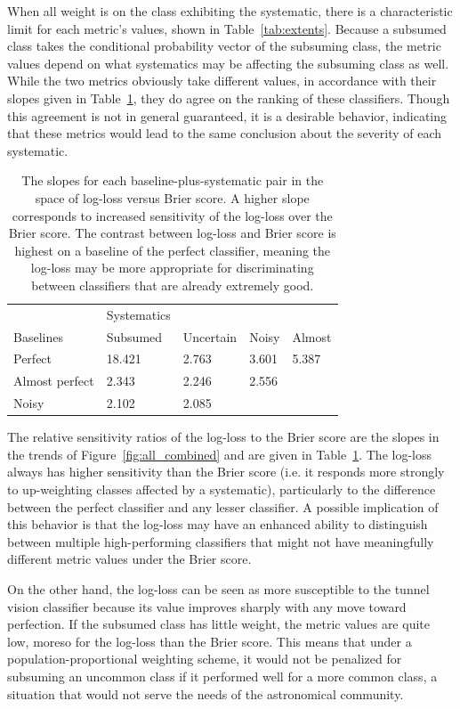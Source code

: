 When all weight is on the class exhibiting the systematic, there is a characteristic limit for each metric's values, shown in Table~\ref{tab:extents}.
Because a subsumed class takes the conditional probability vector of the subsuming class, the metric values depend on what systematics may be affecting the subsuming class as well.
While the two metrics obviously take different values, in accordance with their slopes given in Table~\ref{tab:slopes}, they do agree on the ranking of these classifiers.
Though this agreement is not in general guaranteed, it is a desirable behavior, indicating that these metrics would lead to the same conclusion about the severity of each systematic.

\begin{table}[]
\begin{tabular}{l|llll}
	& Systematics & & &\\
Baselines & Subsumed & Uncertain & Noisy & Almost\\
\hline
Perfect & 18.421 & 2.763 & 3.601 & 5.387\\
Almost perfect & 2.343 & 2.246 & 2.556 & \\
Noisy & 2.102 & 2.085 & &
\end{tabular}
\caption{
The slopes for each baseline-plus-systematic pair in the space of log-loss versus Brier score.
A higher slope corresponds to increased sensitivity of the log-loss over the Brier score.
The contrast between log-loss and Brier score is highest on a baseline of the perfect classifier, meaning the log-loss may be more appropriate for discriminating between classifiers that are already extremely good.
}
\label{tab:slopes}
\end{table}

The relative sensitivity ratios of the log-loss to the Brier score are the slopes in the trends of Figure~\ref{fig:all_combined} and are given in Table~\ref{tab:slopes}.
The log-loss always has higher sensitivity than the Brier score (i.e. it responds more strongly to up-weighting classes affected by a systematic), particularly to the difference between the perfect classifier and any lesser classifier.
A possible implication of this behavior is that the log-loss may have an enhanced ability to distinguish between multiple high-performing classifiers that might not have meaningfully different metric values under the Brier score.

On the other hand, the log-loss can be seen as more susceptible to the tunnel vision classifier because its value improves sharply with any move toward perfection.
If the subsumed class has little weight, the metric values are quite low, moreso for the log-loss than the Brier score.
This means that under a population-proportional weighting scheme, it would not be penalized for subsuming an uncommon class if it performed well for a more common class, a situation that would not serve the needs of the astronomical community.

